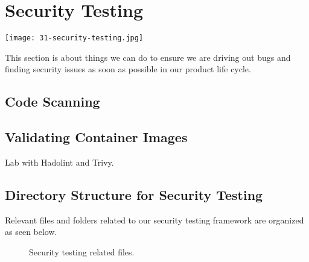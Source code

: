 \chapter{Security Testing}

\texttt{[image: 31-security-testing.jpg]}

This section is about things we can do to ensure we are driving out bugs and finding security issues as soon as possible in our product life cycle.


\section{Code Scanning}


\section{Validating Container Images}

\justifying
Lab with Hadolint and Trivy.



\section{Directory Structure for Security Testing}

\justifying
Relevant files and folders related to our security testing framework are organized as seen below.

\begin{figure}[!htb]
    
    \caption{Security testing related files.}
    \label{sectest}
\end{figure}
